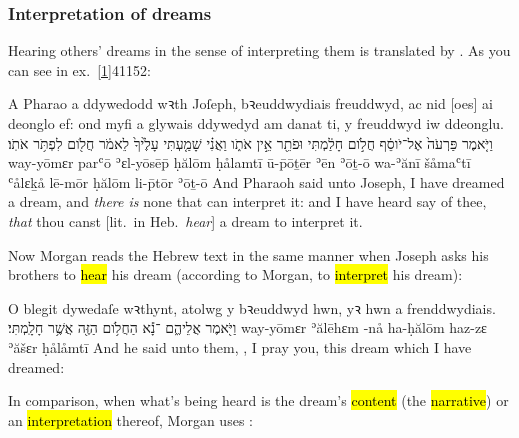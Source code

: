 \subsubsection{Interpretation of dreams}

\begin{paper}
	{\click} Hearing others' dreams in the sense of interpreting them is translated by . As you can see in ex.~\vref{1}{41}{15}{2}:
\end{paper}

\begin{example}{1}{41}{15}{2}{}
	\quoling
	{A Pharao a ddywedodd wꝛth Joſeph, bꝛeuddwydiais freuddwyd, ac nid [oes] ai deonglo ef: ond myfi a glywais ddywedyd am danat ti, y  freuddwyd iw ddeonglu.}
	{וַיֹּ֤אמֶר פַּרְעֹה֙ אֶל־יֹוסֵ֔ף חֲלֹ֣ום חָלַ֔מְתִּי וּפֹתֵ֖ר אֵ֣ין אֹתֹ֑ו וַאֲנִ֗י שָׁמַ֤עְתִּי עָלֶ֙יךָ֙ לֵאמֹ֔ר  חֲלֹ֖ום לִפְתֹּ֥ר אֹתֹֽו׃}
	{way-yōmɛr parʿō ʾɛl-yōsēp̄ ḥălōm ḥålamtī ū-p̄ōṯēr ʾēn ʾōṯ-ō wa-ʾănī šåmaʿtī ʿålɛḵå lē-mōr  ḥălōm li-p̄tōr ʾōṯ-ō}
	{And Pharaoh said unto Joseph, I have dreamed a dream, and \textit{there is} none that can interpret it: and I have heard say of thee, \textit{that} thou canst  [lit.\ in Heb.~\textit{hear}] a dream to interpret it.}
\end{example}

\begin{paper}
	{\click} Now Morgan reads the Hebrew text in the same manner when Joseph asks his brothers to \hl{hear} his dream (according to Morgan, to \hl{interpret} his dream):
\end{paper}

\begin{example}{1}{37}{6}{}{}
	\quoling
	{O blegit dywedaſe wꝛthynt,  atolwg y bꝛeuddwyd hwn, yꝛ hwn a frenddwydiais.}
	{וַיֹּ֖אמֶר אֲלֵיהֶ֑ם ־נָ֕א הַחֲלֹ֥ום הַזֶּ֖ה אֲשֶׁ֥ר חָלָֽמְתִּי׃}
	{way-yōmɛr ʾălēhɛm -nå ha-ḥălōm haz-zɛ ʾăšɛr ḥålåmtī}
	{And he said unto them, , I pray you, this dream which I have dreamed:}
\end{example}

\begin{paper}
	{\click} In comparison, when what's being heard is the dream's \hl{content} (the \hl{narrative}) or an \hl{interpretation} thereof, Morgan uses :
\end{paper}

